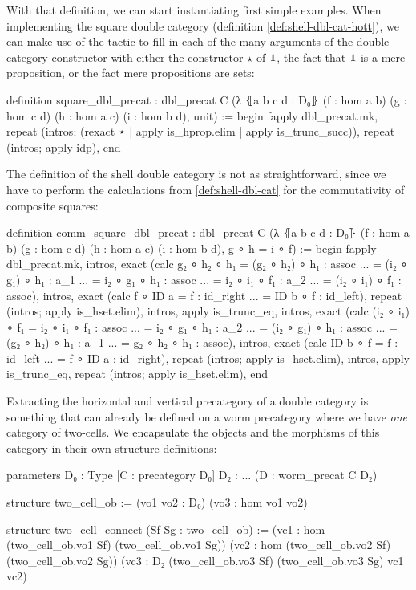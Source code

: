 With that definition, we can start instantiating first simple examples.
When implementing the square double category (definition \ref{def:shell-dbl-cat-hott}),
we can make use of the  tactic to fill in each of the many arguments
of the double category constructor with either the constructor $\star$ of $\mathbf{1}$, the
fact that $\mathbf{1}$ is a mere proposition, or the fact mere propositions are sets:
\begin{leancode}
definition square_dbl_precat : dbl_precat C
  (λ ⦃a b c d : D₀⦄ (f : hom a b) (g : hom c d)
    (h : hom a c) (i : hom b d), unit) :=
begin
  fapply dbl_precat.mk,
    repeat (intros; (rexact ⋆ |  apply is_hprop.elim | apply is_trunc_succ)),
    repeat (intros;  apply idp),
end
\end{leancode}

The definition of the shell double category is not as straightforward, since we
have to perform the calculations from \ref{def:shell-dbl-cat} for the commutativity
of composite squares:
\begin{leancodebr}
definition comm_square_dbl_precat : dbl_precat C
  (λ ⦃a b c d : D₀⦄ (f : hom a b) (g : hom c d)
    (h : hom a c) (i : hom b d), g ∘ h = i ∘ f) :=
begin
  fapply dbl_precat.mk,
    intros, exact (calc g₂ ∘ h₂ ∘ h₁ = (g₂ ∘ h₂) ∘ h₁ : assoc
                                ... = (i₂ ∘ g₁) ∘ h₁ : a_1
                                ... = i₂ ∘ g₁ ∘ h₁ : assoc
                                ... = i₂ ∘ i₁ ∘ f₁ : a_2
                                ... = (i₂ ∘ i₁) ∘ f₁ : assoc),
    intros, exact (calc f ∘ ID a = f : id_right
                             ... = ID b ∘ f : id_left),
    repeat (intros; apply is_hset.elim),
    intros, apply is_trunc_eq,
    intros, exact (calc (i₂ ∘ i₁) ∘ f₁ = i₂ ∘ i₁ ∘ f₁ : assoc
                                   ... = i₂ ∘ g₁ ∘ h₁ : a_2
                                   ... = (i₂ ∘ g₁) ∘ h₁ : assoc
                                   ... = (g₂ ∘ h₂) ∘ h₁ : a_1
                                   ... = g₂ ∘ h₂ ∘ h₁ : assoc),
    intros, exact (calc ID b ∘ f = f : id_left
                             ... = f ∘ ID a : id_right),
    repeat (intros; apply is_hset.elim),
    intros, apply is_trunc_eq,
    repeat (intros; apply is_hset.elim),
end
\end{leancodebr}

Extracting the horizontal and vertical precategory of a double category is
something that can already be defined on a worm precategory where we have \emph{one}
category of two-cells.
We encapsulate the objects and the morphisms of this category in their own
structure definitions:
\begin{leancode}
parameters {D₀ : Type} [C : precategory D₀] {D₂ : ...} (D : worm_precat C D₂)

structure two_cell_ob :=
  (vo1 vo2 : D₀)
  (vo3 : hom vo1 vo2)

structure two_cell_connect (Sf Sg : two_cell_ob) :=
  (vc1 : hom (two_cell_ob.vo1 Sf) (two_cell_ob.vo1 Sg))
  (vc2 : hom (two_cell_ob.vo2 Sf) (two_cell_ob.vo2 Sg))
  (vc3 : D₂ (two_cell_ob.vo3 Sf) (two_cell_ob.vo3 Sg) vc1 vc2)
\end{leancode}

